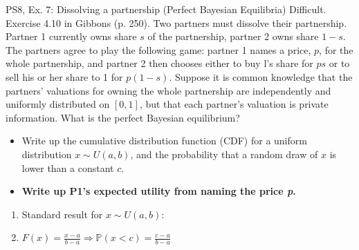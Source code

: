 \begin{frame}{PS8, Ex. 7: Dissolving a partnership (Perfect Bayesian Equilibria)}
    Difficult. Exercise 4.10 in Gibbons (p. 250). Two partners must dissolve their partnership. Partner 1 currently owns share $s$ of the partnership, partner 2 owns share $1-s$. The partners agree to play the following game: partner 1 names a price, $p$, for the whole partnership, and partner 2 then chooses either to buy l's share for $ps$ or to sell his or her share to 1 for $p(1-s)$. Suppose it is common knowledge that the partners' valuations for owning the whole partnership are independently and uniformly distributed on $[0,1]$, but that each partner's valuation is private information. What is the perfect Bayesian equilibrium?\vspace{-8pt}
    \begin{multicols}{2}
      \begin{itemize}
        \item[Step 1:] Write up the cumulative distribution function (CDF) for a uniform distribution $x\sim U(a, b)$, and the probability that a random draw of $x$ is lower than a constant $c$.
        \item[Step 2:] \textbf{Write up P1's expected utility from naming the price \textit{p}.}
      \end{itemize}
      \vfill\null\columnbreak
      \begin{enumerate}
        \item Standard result for $x\sim U(a, b):$
        \item[CDF:] $F(x)=\frac{x-a}{b-a}\Rightarrow\mathbb{P}(x<c)=\frac{c-a}{b-a}$
      \end{enumerate}
      \vfill\null
    \end{multicols}
\end{frame}
